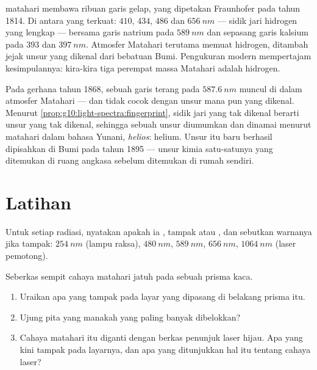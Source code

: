\begin{example}\label{ex:g10:light-spectra:sunrecipe}
 matahari membawa ribuan garis gelap, yang dipetakan Fraunhofer
pada tahun 1814. Di antara yang terkuat: $410$, $434$, $486$ dan
$\qty{656}{nm}$ --- sidik jari hidrogen yang lengkap --- bersama garis
natrium pada $\qty{589}{nm}$ dan sepasang garis kalsium pada $393$ dan
$\qty{397}{nm}$. Atmosfer Matahari terutama memuat hidrogen, ditambah
jejak unsur yang dikenal dari bebatuan Bumi. Pengukuran modern
mempertajam kesimpulannya: kira-kira tiga perempat massa Matahari
adalah hidrogen.
\end{example}

\begin{remark}\label{rem:g10:light-spectra:helium}
Pada gerhana tahun 1868, sebuah garis terang pada $\qty{587.6}{nm}$
muncul di dalam  atmosfer Matahari --- dan tidak cocok dengan
unsur mana pun yang dikenal. Menurut
\cref{prop:g10:light-spectra:fingerprint}, sidik jari yang tak dikenal
berarti unsur yang tak dikenal, sehingga sebuah unsur diumumkan dan
dinamai menurut matahari dalam bahasa Yunani, \emph{helios}: helium.
Unsur itu baru berhasil dipisahkan di Bumi pada tahun 1895 --- unsur
kimia satu-satunya yang ditemukan di ruang angkasa sebelum ditemukan di
rumah sendiri.
\end{remark}

\section{Latihan}

\begin{exercise}[$\star$]\label{exo:g10:light-spectra:1}
Untuk setiap radiasi, nyatakan apakah ia , tampak atau
, dan sebutkan warnanya jika tampak: $\qty{254}{nm}$ (lampu
raksa), $\qty{480}{nm}$, $\qty{589}{nm}$, $\qty{656}{nm}$,
$\qty{1064}{nm}$ (laser pemotong).
\end{exercise}

\begin{exercise}[$\star$]\label{exo:g10:light-spectra:2}
Seberkas sempit cahaya matahari jatuh pada sebuah prisma kaca.
\begin{enumerate}
  \item Uraikan apa yang tampak pada layar yang dipasang di belakang
        prisma itu.
  \item Ujung pita yang manakah yang paling banyak dibelokkan?
  \item Cahaya matahari itu diganti dengan berkas penunjuk laser hijau.
        Apa yang kini tampak pada layarnya, dan apa yang ditunjukkan
        hal itu tentang cahaya laser?
\end{enumerate}
\end{exercise}

